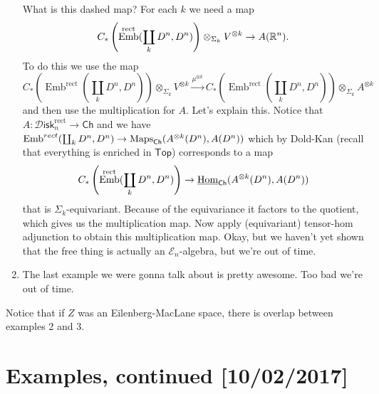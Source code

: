 \documentclass{amsart}
\DeclareMathOperator{\Emb}{Emb}
\newcommand{\Diskr}{\mathscr{D}\mathsf{isk}_n^\text{rect}}
\begin{document}
\begin{enumerate}
        What is this dashed map? For each $k$ we need a map
        \begin{equation*}
            C_*\left( \Emb^\text{rect}(\coprod_k D^n,D^n) \right)\otimes_{\Sigma_k} V^{\otimes k} \to A(\R^n).
        \end{equation*}
        To do this we use the map
        \begin{equation*}
            C_*\left( \Emb^\text{rect}(\coprod_k D^n,D^n) \right)\otimes_{\Sigma_k} V^{\otimes k}
            \xrightarrow{\mu^{\otimes k}} C_*\left( \Emb^\text{rect}(\coprod_kD^n,D^n) \right)\otimes_{\Sigma_k}A^{\otimes k}
        \end{equation*}
        and then use the multiplication for $A$. Let's explain this. Notice that $A:\Diskr\to\mathsf{Ch}$
        and we have $\Emb^{rect}(\coprod_k D^n,D^n)\to \Maps_\mathsf{Ch}(A^{\otimes k}(D^n), A(D^n))$ which by
        Dold-Kan (recall that everything is enriched in $\mathsf{Top}$) corresponds to a map
        \begin{equation*}
            C_*\left( \Emb^\text{rect}(\coprod_k D^n,D^n) \right)\to \underline{\Hom}_\mathsf{Ch}(A^{\otimes k}(D^n),A(D^n))
        \end{equation*}
        that is $\Sigma_k$-equivariant. Because of the equivariance it factors to the quotient, which
        gives us the multiplication map. 
        Now apply (equivariant) tensor-hom adjunction to obtain this multiplication map.
        Okay, but we haven't yet shown that the free thing is actually
        an $\mathcal{E}_n$-algebra, but we're out of time.
    \item The last example we were gonna talk about is pretty awesome. Too bad we're out of time.
\end{enumerate}

Notice that if $Z$ was an Eilenberg-MacLane space, there is overlap between examples 2 and 3.

\newpage

\section{Examples, continued [10/02/2017]}
\end{document}
